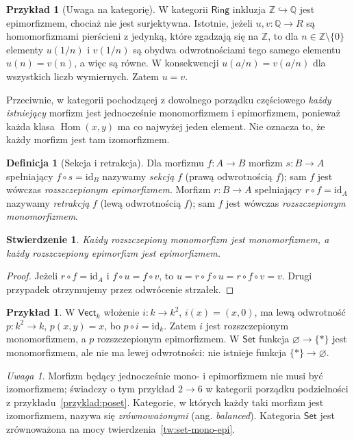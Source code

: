 \documentclass[11pt,a4paper]{article}
\numberwithin{equation}{section}
\theoremstyle{plain}
\newtheorem{stwierdzenie}[twierdzenie]{Stwierdzenie}
\theoremstyle{definition}
\newtheorem{definicja}[twierdzenie]{Definicja}
\newtheorem{przyklad}[twierdzenie]{Przykład}
\theoremstyle{remark}
\newtheorem{uwaga}[twierdzenie]{Uwaga}
\newcommand{\cat}[1]{\mathsf{#1}}
\newcommand{\Set}{\cat{Set}}
\newcommand{\Ring}{\cat{Ring}}
\newcommand{\Vect}{\cat{Vect}}
\newcommand{\id}{\mathrm{id}}
\newcommand{\Hom}{\operatorname{Hom}}
\begin{document}
\begin{przyklad}[Uwaga na kategorię]\label{przyklad:epi-pierscienie}
W kategorii $\Ring$ inkluzja $\mathbb Z\hookrightarrow\mathbb Q$ jest epimorfizmem, chociaż nie jest surjektywna. Istotnie, jeżeli $u,v:\mathbb Q\to R$ są homomorfizmami pierścieni z jedynką, które zgadzają się na $\mathbb Z$, to dla $n\in\mathbb Z\setminus\{0\}$ elementy $u(1/n)$ i $v(1/n)$ są obydwa odwrotnościami tego samego elementu $u(n)=v(n)$, a więc są równe. W konsekwencji $u(a/n)=v(a/n)$ dla wszystkich liczb wymiernych. Zatem $u=v$.

Przeciwnie, w kategorii pochodzącej z dowolnego porządku częściowego \emph{każdy istniejący} morfizm jest jednocześnie monomorfizmem i epimorfizmem, ponieważ każda klasa $\Hom(x,y)$ ma co najwyżej jeden element. Nie oznacza to, że każdy morfizm jest tam izomorfizmem.
\end{przyklad}

\begin{definicja}[Sekcja i retrakcja]
Dla morfizmu $f:A\to B$ morfizm $s:B\to A$ spełniający $f\circ s=\id_B$ nazywamy \emph{sekcją} $f$ (prawą odwrotnością $f$); sam $f$ jest wówczas \emph{rozszczepionym epimorfizmem}. Morfizm $r:B\to A$ spełniający $r\circ f=\id_A$ nazywamy \emph{retrakcją} $f$ (lewą odwrotnością $f$); sam $f$ jest wówczas \emph{rozszczepionym monomorfizmem}.
\end{definicja}

\begin{stwierdzenie}
Każdy rozszczepiony monomorfizm jest monomorfizmem, a każdy rozszczepiony epimorfizm jest epimorfizmem.
\end{stwierdzenie}
\begin{proof}
Jeżeli $r\circ f=\id_A$ i $f\circ u=f\circ v$, to $u=r\circ f\circ u=r\circ f\circ v=v$. Drugi przypadek otrzymujemy przez odwrócenie strzałek.
\end{proof}

\begin{przyklad}
W $\Vect_k$ włożenie $i:k\to k^2$, $i(x)=(x,0)$, ma lewą odwrotność $p:k^2\to k$, $p(x,y)=x$, bo $p\circ i=\id_k$. Zatem $i$ jest rozszczepionym monomorfizmem, a $p$ rozszczepionym epimorfizmem. W $\Set$ funkcja $\varnothing\to\{*\}$ jest monomorfizmem, ale nie ma lewej odwrotności: nie istnieje funkcja $\{*\}\to\varnothing$.
\end{przyklad}

\begin{uwaga}
Morfizm będący jednocześnie mono- i epimorfizmem nie musi być izomorfizmem; świadczy o tym przykład $2\to6$ w kategorii porządku podzielności z przykładu~\ref{przyklad:poset}. Kategorie, w których każdy taki morfizm jest izomorfizmem, nazywa się \emph{zrównoważonymi} (ang. \emph{balanced}). Kategoria $\Set$ jest zrównoważona na mocy twierdzenia~\ref{tw:set-mono-epi}.
\end{uwaga}
\end{document}
